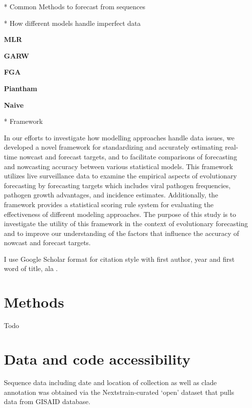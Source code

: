 \documentclass[11pt,oneside,letterpaper]{article}
\begin{document}
* Common Methods to forecast from sequences





* How different models handle imperfect data

\textbf{MLR}

\textbf{GARW}

\textbf{FGA}

\textbf{Piantham}

\textbf{Naive}


* Framework

In our efforts to investigate how modelling approaches handle data issues, we developed a novel framework for standardizing and accurately estimating real-time nowcast and forecast targets, and to facilitate comparisons of forecasting and nowcasting accuracy between various statistical models.
This framework utilizes live surveillance data to examine the empirical aspects of evolutionary forecasting by forecasting targets which includes viral pathogen frequencies, pathogen growth advantages, and incidence estimates. 
Additionally, the framework provides a statistical scoring rule system for evaluating the effectiveness of different modeling approaches.
The purpose of this study is to investigate the utility of this framework in the context of evolutionary forecasting and to improve our understanding of the factors that influence the accuracy of nowcast and forecast targets.











I use Google Scholar format for citation style with first author, year and first word of title, ala \cite{hadfield2018nextstrain}.

\section*{Methods}

Todo




\section*{Data and code accessibility}

Sequence data including date and location of collection as well as clade annotation was obtained via the Nextstrain-curated ‘open’
dataset that pulls data from GISAID database. 
\end{document}
